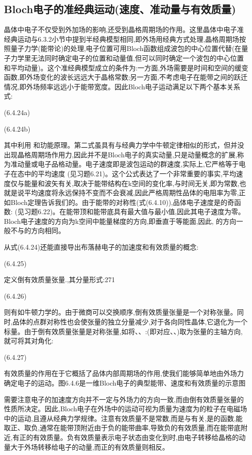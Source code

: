 \subsection{Bloch电子的准经典运动(速度、准动量与有效质量)}

晶体中电子不仅受到外加场的影响,还受到晶格周期场的作用。这里晶体中电子准经典运动与6.3.2小节中提到半经典模型相同,即外场用经典方式处理,晶格周期场按照量子力学(能带论)的处理,电子位置可用Bloch函数组成波包的中心位置代替(在量子力学里无法同时确定电子的位置和动量值,但可以同时确定一个波包的中心位置和平均动量)。这个准经典模型成立的条件为:一方面,外场需要是时间和空间的缓变函数,即外场变化的波长远远大于晶格常数;另一方面,不考虑电子在能带之间的跃迁情况,即外场频率远远小于能带宽度。因此Bloch电子运动满足以下两个基本关系式:

 	(6.4.24a)

	 (6.4.24b)

	其中利用 和玏能原理。第二式虽具有与经典力学中牛顿定律相似的形式，但并没出现晶格周期场作用力,因此并不是Bloch电子的真实动量,只是动量概念的扩展,称为准动量或电子品格动量。电子速度即是波包运动的群速度,实际上,它严格等于电子在态中的平均速度 (见习题6.21)。这个公式表达了一个非常重要的事实,平均速度仅与能量和波矢有关,取决于能带结构在k空间的变化率,与时间无关,即为常数,也就是说平均速度将永远保持不变而不会衰减,因此严格周期性品体的电阻率为零,正如Bloch定理告诉我们的。由于能带的对称性(式(6.4.10)),品体电子速度是的奇函数:  (见习题6.22)。在能带顶和能带底具有最大值与最小值,因此其电子速度为零。Bloch电子速度的方向为k空间中能量梯度的方向,即垂直于等能面,因此, 的方向一般不与的方向相同。

从式(6.4.24)还能直接导出布落赫电子的加速度和有效质量的概念:

 	(6.4.25)

定义倒有效质量张量.,其分量形式:271

 (6.4.26)

则有如牛顿力学的。由于微商可以交换顺序,倒有效质量张量是一个对称张量。同时,品体的点群对称性也会使张量的独立分量减少,对于各向同性晶体,它退化为一个标量。由于倒有效质量张量是对称张量,如将、、:(即对应、、)取为张量的主轴方向,就可将其对角化:

 	(6.4.27)

有效质量的作用在于它概括了品体内部周期场的作用,使我们能够简单地由外场力确定电子的运动。图6.4.6是一维Bloch电子的典型能带、速度和有效质量的示意图



需要注意电子的加速度方向并不一定与外场力的方向一致,而由倒有效质量张量的性质所决定。因此,Bloch电子在外场中的运动可视为质量为速度为的粒子在电磁场中的运动,且遵从经典力学规律。注意有效质量不是常数,而是与有关,是的函数,能取正、取负,通常在能带顶附近由于负的能带曲率,导致负的有效质量,而在能带底附近,有正的有效质量。负有效质量表示电子状态由变化到时,由电子转移给晶格的动量大于外场转移给电子的动量,而正的有效质量则相反。


